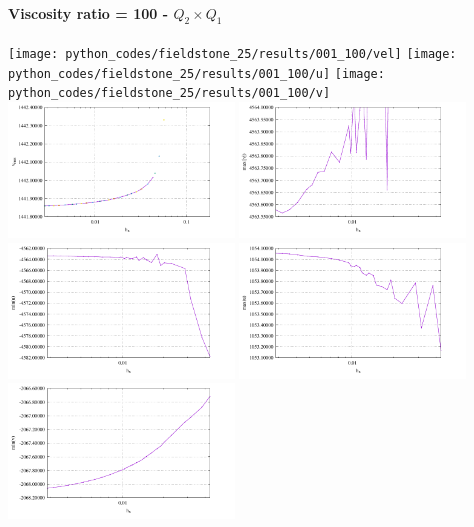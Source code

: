 \newpage
\paragraph{Viscosity ratio = 100 - $Q_2\times Q_1$}

\begin{center}
\texttt{[image: python\_codes/fieldstone\_25/results/001\_100/vel]}
\texttt{[image: python\_codes/fieldstone\_25/results/001\_100/u]}
\texttt{[image: python\_codes/fieldstone\_25/results/001\_100/v]}\\
\includegraphics[width=6cm]{python_codes/fieldstone_25/results/vrms_001.pdf}
\includegraphics[width=6cm]{python_codes/fieldstone_25/results/max_vel_001.pdf}\\
\includegraphics[width=6cm]{python_codes/fieldstone_25/results/min_u_001.pdf}
\includegraphics[width=6cm]{python_codes/fieldstone_25/results/max_u_001.pdf}\\
\includegraphics[width=6cm]{python_codes/fieldstone_25/results/min_v_001.pdf}

\end{center}
